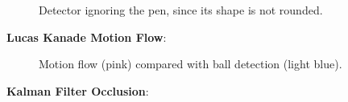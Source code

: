 \documentclass{sciposter}
\begin{document}
\begin{multicols}{3}
\begin{figure}[!h]
	\centering
			\setlength{\fboxsep}{1pt}
			\setlength{\fboxrule}{1pt}
	\caption{Detector ignoring the pen, since its shape is not rounded.}
	\label{fig:yes_hough}
\end{figure}

\textbf{Lucas Kanade Motion Flow}:

\begin{figure}[!h]
	\centering
			\setlength{\fboxsep}{1pt}
			\setlength{\fboxrule}{1pt}
	\caption{Motion flow (pink) compared with ball detection (light blue).}
	\label{fig:motion}
\end{figure}

\textbf{Kalman Filter Occlusion}:


\end{multicols}
\end{document}
